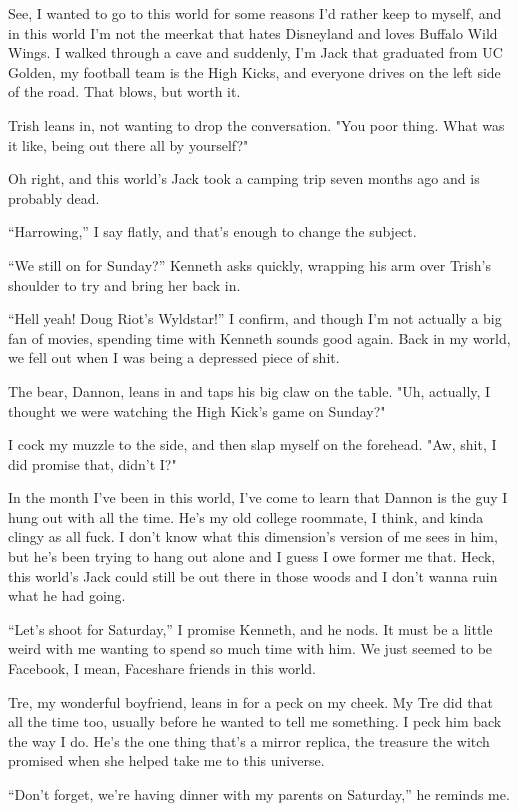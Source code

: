 See, I wanted to go to this world for some reasons I'd rather keep to
myself, and in this world I'm not the meerkat that hates Disneyland and
loves Buffalo Wild Wings. I walked through a cave and suddenly, I'm Jack
that graduated from UC Golden, my football team is the High Kicks, and
everyone drives on the left side of the road. That blows, but worth it.

Trish leans in, not wanting to drop the conversation. "You poor thing.
What was it like, being out there all by yourself?"

Oh right, and this world's Jack took a camping trip seven months ago and
is probably dead.

``Harrowing,'' I say flatly, and that's enough to change the subject.

``We still on for Sunday?'' Kenneth asks quickly, wrapping his arm over
Trish's shoulder to try and bring her back in.

``Hell yeah! Doug Riot's Wyldstar!'' I confirm, and though I'm not
actually a big fan of movies, spending time with Kenneth sounds good
again. Back in my world, we fell out when I was being a depressed piece
of shit.

The bear, Dannon, leans in and taps his big claw on the table. "Uh,
actually, I thought we were watching the High Kick's game on Sunday?"

I cock my muzzle to the side, and then slap myself on the forehead. "Aw,
shit, I did promise that, didn't I?"

In the month I've been in this world, I've come to learn that Dannon is
the guy I hung out with all the time. He's my old college roommate, I
think, and kinda clingy as all fuck. I don't know what this dimension's
version of me sees in him, but he's been trying to hang out alone and I
guess I owe former me that. Heck, this world's Jack could still be out
there in those woods and I don't wanna ruin what he had going.

``Let's shoot for Saturday,'' I promise Kenneth, and he nods. It must be a
little weird with me wanting to spend so much time with him. We just
seemed to be Facebook, I mean, Faceshare friends in this world.

Tre, my wonderful boyfriend, leans in for a peck on my cheek. My Tre did
that all the time too, usually before he wanted to tell me something. I
peck him back the way I do. He's the one thing that's a mirror replica,
the treasure the witch promised when she helped take me to this
universe.

``Don't forget, we're having dinner with my parents on Saturday,'' he
reminds me.

